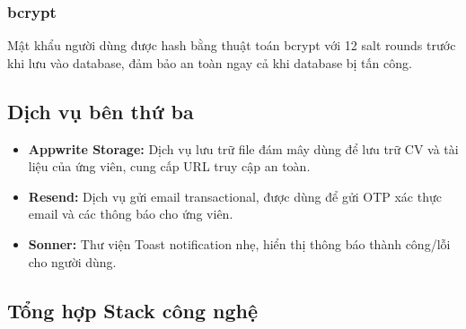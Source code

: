 \subsubsection*{bcrypt}
Mật khẩu người dùng được hash bằng thuật toán bcrypt với 12 salt rounds trước khi lưu vào database, đảm bảo an toàn ngay cả khi database bị tấn công.

\subsection{Dịch vụ bên thứ ba}

\begin{itemize}
    \item \textbf{Appwrite Storage:} Dịch vụ lưu trữ file đám mây dùng để lưu trữ CV và tài liệu của ứng viên, cung cấp URL truy cập an toàn.
    \item \textbf{Resend:} Dịch vụ gửi email transactional, được dùng để gửi OTP xác thực email và các thông báo cho ứng viên.
    \item \textbf{Sonner:} Thư viện Toast notification nhẹ, hiển thị thông báo thành công/lỗi cho người dùng.
\end{itemize}

\subsection{Tổng hợp Stack công nghệ}

